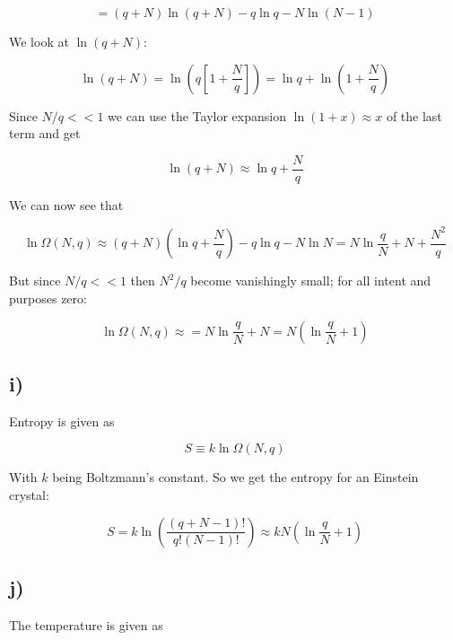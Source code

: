 \documentclass[a4paper,norsk, 10pt]{article}
\begin{document}
\begin{equation}
= (q+N)\ln (q + N) - q\ln q - N\ln (N-1)
\end{equation}
	
We look at $\ln (q + N)$:

\begin{equation}
\ln (q + N) = \ln\left(q\left[1+\frac{N}{q}\right]\right) = \ln q + \ln\left(1+\frac{N}{q}\right)
\end{equation}

Since $N/q << 1$ we can use the Taylor expansion $\ln(1+x) \approx x$ of the last term and get

\begin{equation}
\ln (q + N) \approx \ln q + \frac{N}{q}
\end{equation}

We can now see that

\begin{equation}
\ln \Omega(N,q) \approx (q+N)\left(\ln q + \frac{N}{q}\right) - q\ln q - N\ln N = N\ln\frac{q}{N} + N + \frac{N^2}{q}
\end{equation}

But since $N/q << 1$ then $N^2/q$ become vanishingly small; for all intent and purposes zero:

\begin{equation}
\ln \Omega(N,q) \approx = N\ln\frac{q}{N} + N = N\left(\ln\frac{q}{N} + 1\right)
\end{equation}

\subsection{i)}

Entropy is given as

\begin{equation}
S \equiv k \ln \Omega(N,q)
\end{equation}\label{eq:entropy}

With $k$ being Boltzmann's constant. So we get the entropy for an Einstein crystal:

\begin{equation}
S = k\ln\left(\frac{(q+N-1)!}{q!(N-1)!}\right) \approx k N\left(\ln\frac{q}{N} + 1\right)
\end{equation}

\subsection{j)}
The temperature is given as
\end{document}
